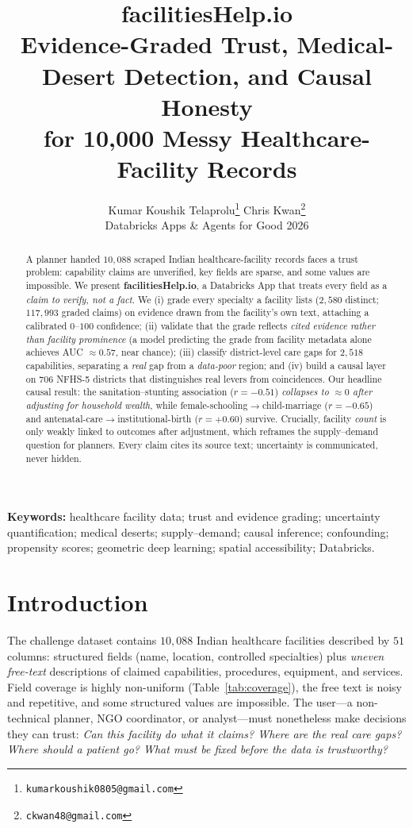 \documentclass[11pt]{article}
\title{\textbf{facilitiesHelp.io}\\[2pt]
\large Evidence-Graded Trust, Medical-Desert Detection, and Causal Honesty\\ for 10{,}000 Messy Healthcare-Facility Records}
\author{Kumar Koushik Telaprolu\thanks{\texttt{kumarkoushik0805@gmail.com}} \quad\quad Chris Kwan\thanks{\texttt{ckwan48@gmail.com}}\\[2pt]
\small Databricks Apps \& Agents for Good 2026}
\date{}
\begin{document}
\maketitle

\begin{abstract}
\noindent A planner handed $10{,}088$ scraped Indian healthcare-facility records faces a trust problem: capability claims are unverified, key fields are sparse, and some values are impossible. We present \textbf{facilitiesHelp.io}, a Databricks App that treats every field as a \emph{claim to verify, not a fact}. We (i) grade every specialty a facility lists ($2{,}580$ distinct; $117{,}993$ graded claims) on evidence drawn from the facility's own text, attaching a calibrated $0\text{--}100$ confidence; (ii) validate that the grade reflects \emph{cited evidence rather than facility prominence} (a model predicting the grade from facility metadata alone achieves AUC $\approx 0.57$, near chance); (iii) classify district-level care gaps for $2{,}518$ capabilities, separating a \emph{real} gap from a \emph{data-poor} region; and (iv) build a causal layer on $706$ NFHS-5 districts that distinguishes real levers from coincidences. Our headline causal result: the sanitation--stunting association ($r=-0.51$) \emph{collapses to $\approx 0$ after adjusting for household wealth}, while female-schooling$\to$child-marriage ($r=-0.65$) and antenatal-care$\to$institutional-birth ($r=+0.60$) survive. Crucially, facility \emph{count} is only weakly linked to outcomes after adjustment, which reframes the supply--demand question for planners. Every claim cites its source text; uncertainty is communicated, never hidden.
\end{abstract}

\smallskip
\noindent\textbf{Keywords:} healthcare facility data; trust and evidence grading; uncertainty quantification; medical deserts; supply--demand; causal inference; confounding; propensity scores; geometric deep learning; spatial accessibility; Databricks.

\section{Introduction}
The challenge dataset contains $10{,}088$ Indian healthcare facilities described by $51$ columns: structured fields (name, location, controlled specialties) plus \emph{uneven free-text} descriptions of claimed capabilities, procedures, equipment, and services. Field coverage is highly non-uniform (Table~\ref{tab:coverage}), the free text is noisy and repetitive, and some structured values are impossible. The user---a non-technical planner, NGO coordinator, or analyst---must nonetheless make decisions they can trust: \emph{Can this facility do what it claims? Where are the real care gaps? Where should a patient go? What must be fixed before the data is trustworthy?}
\end{document}
